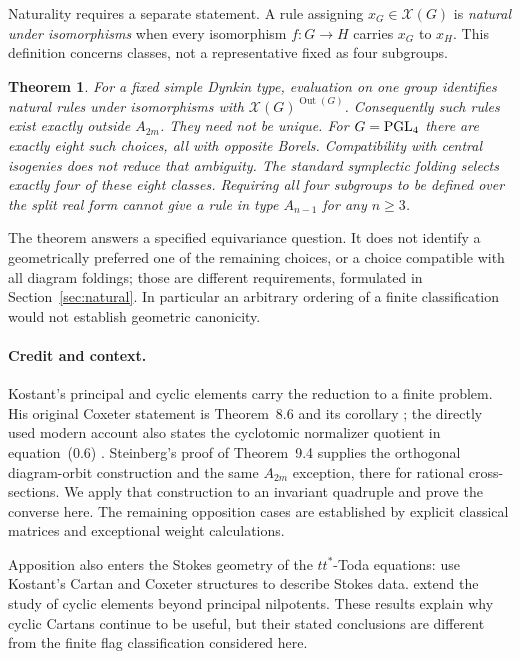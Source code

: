 \documentclass[11pt]{article}
\newcommand{\Out}{\operatorname{Out}}\newcommand{\Inn}{\operatorname{Inn}}
\newtheorem{theorem}{Theorem}[section]
\theoremstyle{definition}\newtheorem{definition}[theorem]{Definition}
\theoremstyle{remark}\newtheorem{remark}[theorem]{Remark}
\begin{document}
Naturality requires a separate statement. A rule assigning $x_G\in\mathcal X(G)$ is \emph{natural under isomorphisms} when every isomorphism $f:G\to H$ carries $x_G$ to $x_H$. This definition concerns classes, not a representative fixed as four subgroups.

\begin{theorem}\label{thm:natural}
For a fixed simple Dynkin type, evaluation on one group identifies natural rules under isomorphisms with $\mathcal X(G)^{\Out(G)}$. Consequently such rules exist exactly outside $A_{2m}$. They need not be unique. For $G=\operatorname{PGL}_4$ there are exactly eight such choices, all with opposite Borels. Compatibility with central isogenies does not reduce that ambiguity. The standard symplectic folding selects exactly four of these eight classes. Requiring all four subgroups to be defined over the split real form cannot give a rule in type $A_{n-1}$ for any $n\geq3$.
\end{theorem}

The theorem answers a specified equivariance question. It does not identify a geometrically preferred one of the remaining choices, or a choice compatible with all diagram foldings; those are different requirements, formulated in Section~\ref{sec:natural}. In particular an arbitrary ordering of a finite classification would not establish geometric canonicity.

\paragraph{Credit and context.}
Kostant's principal and cyclic elements carry the reduction to a finite problem. His original Coxeter statement is Theorem~8.6 and its corollary \citep[p.~1026]{Kostant1959}; the directly used modern account also states the cyclotomic normalizer quotient in equation~(0.6) \citep[p.~3]{Kostant2010}. Steinberg's proof of Theorem~9.4 \citep[pp.~72--73]{Steinberg1965} supplies the orthogonal diagram-orbit construction and the same $A_{2m}$ exception, there for rational cross-sections. We apply that construction to an invariant quadruple and prove the converse here. The remaining opposition cases are established by explicit classical matrices and exceptional weight calculations.

Apposition also enters the Stokes geometry of the $tt^*$-Toda equations: \citet[\S3, pp.~9--10; \S5]{GuestHo2019} use Kostant's Cartan and Coxeter structures to describe Stokes data. \citet[Introduction and \S6]{Elashvili2013} extend the study of cyclic elements beyond principal nilpotents. These results explain why cyclic Cartans continue to be useful, but their stated conclusions are different from the finite flag classification considered here.
\end{document}
